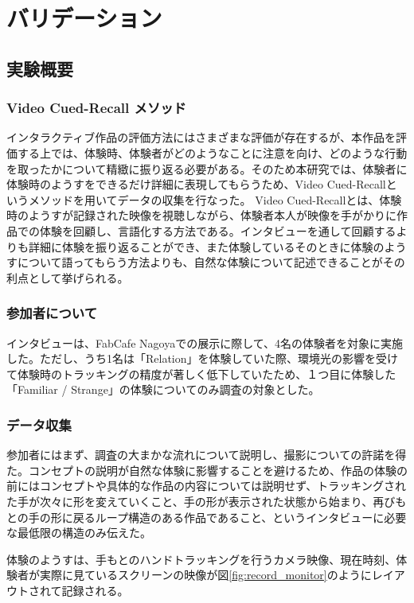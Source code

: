 \chapter{バリデーション}
\section{実験概要}
\subsection{Video Cued-Recall メソッド}
インタラクティブ作品の評価方法にはさまざまな評価が存在するが、本作品を評価する上では、体験時、体験者がどのようなことに注意を向け、どのような行動を取ったかについて精緻に振り返る必要がある。そのため本研究では、体験者に体験時のようすをできるだけ詳細に表現してもらうため、Video Cued-Recallというメソッドを用いてデータの収集を行なった。 Video Cued-Recallとは、体験時のようすが記録された映像を視聴しながら、体験者本人が映像を手がかりに作品での体験を回顧し、言語化する方法である。インタビューを通して回顧するよりも詳細に体験を振り返ることができ、また体験しているそのときに体験のようすについて語ってもらう方法よりも、自然な体験について記述できることがその利点として挙げられる。

\subsection{参加者について}
インタビューは、FabCafe Nagoyaでの展示に際して、4名の体験者を対象に実施した。ただし、うち1名は「Relation」を体験していた際、環境光の影響を受けて体験時のトラッキングの精度が著しく低下していたため、１つ目に体験した「Familiar / Strange」の体験についてのみ調査の対象とした。

\subsection{データ収集}
参加者にはまず、調査の大まかな流れについて説明し、撮影についての許諾を得た。コンセプトの説明が自然な体験に影響することを避けるため、作品の体験の前にはコンセプトや具体的な作品の内容については説明せず、トラッキングされた手が次々に形を変えていくこと、手の形が表示された状態から始まり、再びもとの手の形に戻るループ構造のある作品であること、というインタビューに必要な最低限の構造のみ伝えた。

体験のようすは、手もとのハンドトラッキングを行うカメラ映像、現在時刻、体験者が実際に見ているスクリーンの映像が図\ref{fig:record_monitor}のようにレイアウトされて記録される。

